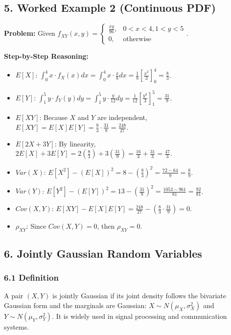 \documentclass{article}
\begin{document}
\subsection*{5. Worked Example 2 (Continuous PDF)}
\textbf{Problem:} Given $f_{XY}(x,y) = \begin{cases} \frac{xy}{96}, & 0 < x < 4, 1 < y < 5 \\ 0, & \text{otherwise} \end{cases}$.

\textbf{Step-by-Step Reasoning:}
\begin{itemize}
    \item $E[X]$: $\int_{0}^{4} x \cdot f_X(x) dx = \int_{0}^{4} x \cdot \frac{x}{8} dx = \frac{1}{8}[\frac{x^3}{3}]_0^4 = \frac{8}{3}$.
    \item $E[Y]$: $\int_{1}^{5} y \cdot f_Y(y) dy = \int_{1}^{5} y \cdot \frac{y}{12} dy = \frac{1}{12}[\frac{y^3}{3}]_1^5 = \frac{31}{9}$.
    \item $E[XY]$: Because $X$ and $Y$ are independent, $E[XY] = E[X]E[Y] = \frac{8}{3} \cdot \frac{31}{9} = \frac{248}{27}$.
    \item $E[2X+3Y]$: By linearity, $2E[X] + 3E[Y] = 2(\frac{8}{3}) + 3(\frac{31}{9}) = \frac{16}{3} + \frac{31}{3} = \frac{47}{3}$.
    \item $Var(X)$: $E[X^2] - (E[X])^2 = 8 - (\frac{8}{3})^2 = \frac{72-64}{9} = \frac{8}{9}$.
    \item $Var(Y)$: $E[Y^2] - (E[Y])^2 = 13 - (\frac{31}{9})^2 = \frac{1053-961}{81} = \frac{92}{81}$.
    \item $Cov(X,Y)$: $E[XY] - E[X]E[Y] = \frac{248}{27} - (\frac{8}{3} \cdot \frac{31}{9}) = 0$.
    \item $\rho_{XY}$: Since $Cov(X,Y) = 0$, then $\rho_{XY} = 0$.
\end{itemize}

\subsection*{6. Jointly Gaussian Random Variables}
\subsubsection*{6.1 Definition}
A pair $(X, Y)$ is jointly Gaussian if its joint density follows the bivariate Gaussian form and the marginals are Gaussian: $X \sim N(\mu_X, \sigma_X^2)$ and $Y \sim N(\mu_Y, \sigma_Y^2)$. It is widely used in signal processing and communication systems.
\end{document}
